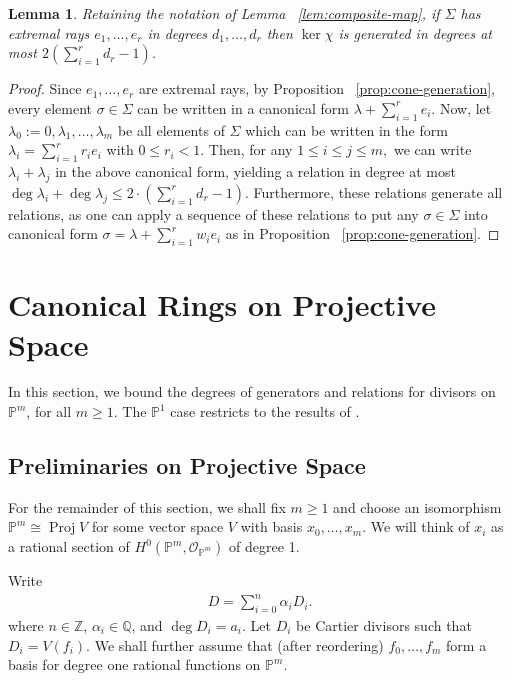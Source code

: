 \documentclass{amsart}
\theoremstyle{plain}
\newtheorem{lem}[thm]{Lemma}
\theoremstyle{definition}
\theoremstyle{remark}
\numberwithin{equation}{section}
\newcommand\ssec{\subsection}
\newcommand\bq{{\mathbb Q}}
\newcommand\bp{{\mathbb P}}
\newcommand\bz{{\mathbb Z}}
\newcommand\sco{{\mathscr O}}
\newcommand\bida{a}
\DeclareMathOperator{\proj}{Proj}
\begin{document}
\begin{lem}
\label{lem:bound-ker-chi}
Retaining the notation of Lemma ~\ref{lem:composite-map}, if $\Sigma$ has
extremal rays $e_1,\ldots, e_r$ in degrees $d_1, \ldots, d_r$ then $\ker \chi$
is generated in degrees at most $2(\sum_{i=1}^{r}d_r-1)$.
\end{lem}
\begin{proof}
Since $e_1, \ldots, e_r$ are extremal rays, by Proposition
~\ref{prop:cone-generation}, every element $\sigma \in \Sigma$ can be written
in a canonical form $\lambda + \sum_{i=1}^{r}e_i$. Now, let $\lambda_0 :=
0,\lambda_1, \ldots, \lambda_m$ be all elements of $\Sigma$ which can be
written in the form $\lambda_i = \sum_{i=1}^{r}r_i e_i$ with $0 \leq r_i < 1.$
Then, for any $1 \leq i \leq j \leq m,$ we can write $\lambda_i + \lambda_j$ in
the above canonical form, yielding a relation in degree at most $\deg \lambda_i
+ \deg \lambda_j \leq 2 \cdot \left( \sum_{i=1}^{r}d_r -1 \right).$
Furthermore, these relations generate all relations, as one can apply a
sequence of these relations to put any $\sigma \in \Sigma$ into canonical form
$\sigma = \lambda + \sum_{i=1}^{r}w_i e_i$ as in Proposition
~\ref{prop:cone-generation}.
\end{proof}


\section{Canonical Rings on Projective Space}
\label{sec:proj}
In this section, we bound the degrees of generators and relations for divisors
on $\bp^m$, for all $m \geq 1$. The $\bp^1$ case restricts to the results of
\cite{dorney:canonical}.

\ssec{Preliminaries on Projective Space}

For the remainder of this section, we shall fix $m \geq 1$ and choose an
isomorphism $\bp^m \cong \proj V$ for some vector space $V$ with basis $x_0,\ldots, x_m$.  We will think of $x_i$ as a rational section of $H^0(\bp^m,
\sco_{\bp^m})$ of degree 1.

Write
\begin{align*}
	D = \sum_{i=0}^{n}\alpha_i D_i.
\end{align*}
where $n \in \bz$, $\alpha_i \in \bq$, and $\deg D_i = \bida_i$. Let $D_i$ be
Cartier divisors such that $D_i = V(f_i)$.
We shall further assume that (after reordering) $f_0,\ldots, f_{m}$ form a
basis for degree one rational functions on $\bp^m$.
\end{document}
